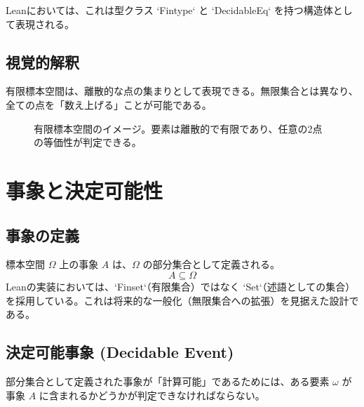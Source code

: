 \documentclass[a4paper,11pt]{article}
\theoremstyle{definition}
\begin{document}
Leanにおいては、これは型クラス `Fintype` と `DecidableEq` を持つ構造体として表現される。

\subsection{視覚的解釈}
有限標本空間は、離散的な点の集まりとして表現できる。無限集合とは異なり、全ての点を「数え上げる」ことが可能である。

\begin{figure}[h]
    \centering
    \caption{有限標本空間のイメージ。要素は離散的で有限であり、任意の2点の等価性が判定できる。}
\end{figure}

\section{事象と決定可能性}

\subsection{事象の定義}
標本空間 $\Omega$ 上の事象 $A$ は、$\Omega$ の部分集合として定義される。
\[ A \subseteq \Omega \]
Leanの実装においては、`Finset`（有限集合）ではなく `Set`（述語としての集合）を採用している。これは将来的な一般化（無限集合への拡張）を見据えた設計である。

\subsection{決定可能事象 (Decidable Event)}
部分集合として定義された事象が「計算可能」であるためには、ある要素 $\omega$ が事象 $A$ に含まれるかどうかが判定できなければならない。
\end{document}
